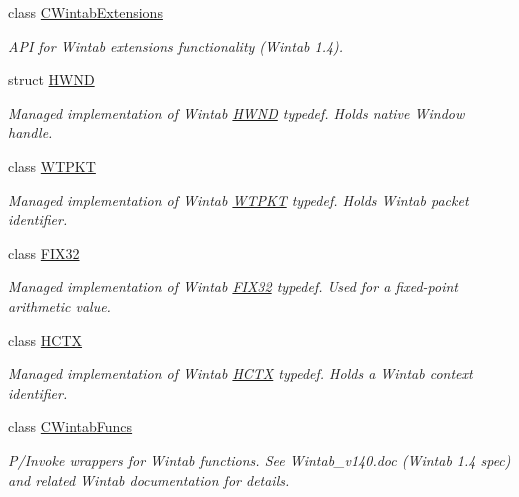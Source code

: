 \begin{DoxyCompactItemize}
class \hyperlink{class_wintab_d_n_1_1_c_wintab_extensions}{CWintabExtensions}
\begin{DoxyCompactList}\small\item\em API for Wintab extensions functionality (Wintab 1.4). \item\end{DoxyCompactList}\item 
struct \hyperlink{struct_wintab_d_n_1_1_h_w_n_d}{HWND}
\begin{DoxyCompactList}\small\item\em Managed implementation of Wintab \hyperlink{struct_wintab_d_n_1_1_h_w_n_d}{HWND} typedef. Holds native Window handle. \item\end{DoxyCompactList}\item 
class \hyperlink{class_wintab_d_n_1_1_w_t_p_k_t}{WTPKT}
\begin{DoxyCompactList}\small\item\em Managed implementation of Wintab \hyperlink{class_wintab_d_n_1_1_w_t_p_k_t}{WTPKT} typedef. Holds Wintab packet identifier. \item\end{DoxyCompactList}\item 
class \hyperlink{class_wintab_d_n_1_1_f_i_x32}{FIX32}
\begin{DoxyCompactList}\small\item\em Managed implementation of Wintab \hyperlink{class_wintab_d_n_1_1_f_i_x32}{FIX32} typedef. Used for a fixed-\/point arithmetic value. \item\end{DoxyCompactList}\item 
class \hyperlink{class_wintab_d_n_1_1_h_c_t_x}{HCTX}
\begin{DoxyCompactList}\small\item\em Managed implementation of Wintab \hyperlink{class_wintab_d_n_1_1_h_c_t_x}{HCTX} typedef. Holds a Wintab context identifier. \item\end{DoxyCompactList}\item 
class \hyperlink{class_wintab_d_n_1_1_c_wintab_funcs}{CWintabFuncs}
\begin{DoxyCompactList}\small\item\em P/Invoke wrappers for Wintab functions. See Wintab\_\-v140.doc (Wintab 1.4 spec) and related Wintab documentation for details. \item\end{DoxyCompactList}\item 

\end{DoxyCompactItemize}
